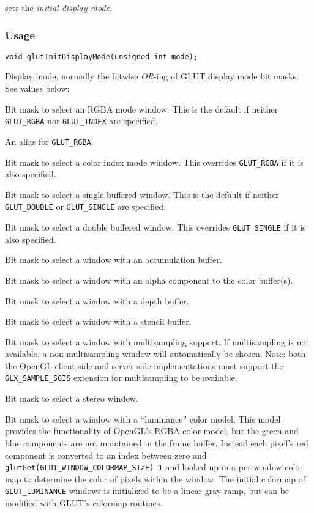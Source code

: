  sets the {\em initial display mode}.

\subsubsection*{Usage}

\begin{verbatim}
void glutInitDisplayMode(unsigned int mode);
\end{verbatim}
\begin{description}
\itemsep 0in
\item[{\tt mode}]
Display mode, normally the bitwise {\em OR}-ing of GLUT display mode bit masks.
See values below:
\end{description}
\begin{description}
\itemsep 0in
\item[{\tt GLUT\_RGBA}]
Bit mask to select an RGBA mode window.  This is the default if neither {\tt GLUT\_RGBA}
nor {\tt GLUT\_INDEX} are specified.
\item[{\tt GLUT\_RGB}]
An alias for {\tt GLUT\_RGBA}.
\item[{\tt GLUT\_INDEX}]
Bit mask to select a color index mode window.  This overrides {\tt GLUT\_RGBA} if it is also
specified.
\item[{\tt GLUT\_SINGLE}]
Bit mask to select a single buffered window.  This is the default if neither {\tt GLUT\_DOUBLE}
or {\tt GLUT\_SINGLE} are specified.
\item[{\tt GLUT\_DOUBLE}]
Bit mask to select a double buffered window.  This overrides {\tt GLUT\_SINGLE} if it is also
specified.
\item[{\tt GLUT\_ACCUM}]
Bit mask to select a window with an accumulation buffer.
\item[{\tt GLUT\_ALPHA}]
Bit mask to select a window with an alpha component to the color buffer(s).
\item[{\tt GLUT\_DEPTH}]
Bit mask to select a window with a depth buffer.
\item[{\tt GLUT\_STENCIL}]
Bit mask to select a window with a stencil buffer.
\item[{\tt GLUT\_MULTISAMPLE}]
Bit mask to select a window with multisampling support.  If multisampling is
not available, a non-multisampling window will automatically be chosen.
Note:  both the OpenGL client-side and server-side implementations must support
the {\tt GLX\_SAMPLE\_SGIS} extension for multisampling to be available.
\item[{\tt GLUT\_STEREO}]
Bit mask to select a stereo window.
\item[{\tt GLUT\_LUMINANCE}]
Bit mask to select a window with a ``luminance'' color model.  This
model provides the functionality of OpenGL's RGBA color model, but the
green and blue components are not maintained in the frame buffer.
Instead each pixel's red component is converted to an index between zero and
{\tt glutGet(GLUT\_WINDOW\_COLORMAP\_SIZE)-1} and looked up in a per-window
color map to determine the color of pixels within the window.
The initial colormap of {\tt GLUT\_LUMINANCE} windows is
initialized to be a linear gray ramp, but can be modified with
GLUT's colormap routines.
\end{description}

